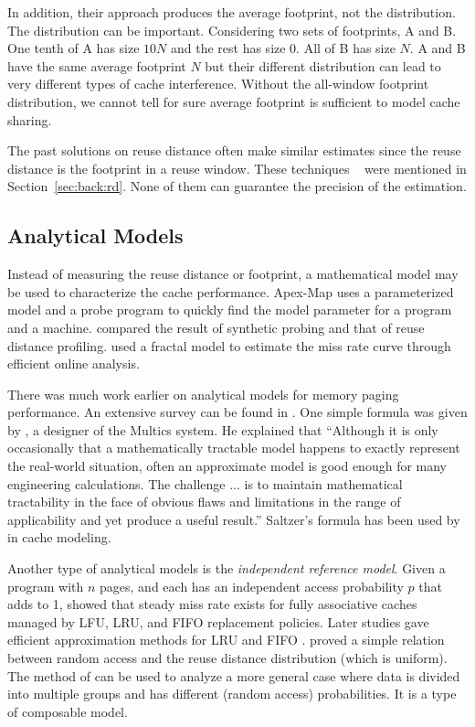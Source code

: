 In addition, their approach produces the average footprint, not the
distribution. The distribution can be important.  Considering two sets
of footprints, A and B.  One tenth of A has size $10N$ and the rest
has size 0.  All of B has size $N$.  A and B have the same average
footprint $N$ but their different distribution can lead to very
different types of cache interference. Without the all-window
footprint distribution, we cannot tell for sure average footprint is
sufficient to model cache sharing.

The past solutions on reuse distance often make similar
estimates since the reuse distance is the footprint in a reuse window.
These techniques
~\citep{BergH:SIGMETRICS05,Shen+:POPL07,ShenS:LCPC08,DingC:MSR09,Jiang+:CC10}
were mentioned in Section~\ref{sec:back:rd}.  None of them can
guarantee the precision of the estimation.

\subsection{Analytical Models}

Instead of measuring the reuse distance or footprint, a mathematical
model may be used to characterize the cache performance.  Apex-Map
uses a parameterized model and a probe program to quickly find the
model parameter for a program and a machine\citep{StrohmaierS:CCPE07}.
\citet{IbrahimS:ICPP10} compared the result of synthetic probing and
that of reuse distance profiling.  \citet{He+:IPDPS12} used a fractal
model to estimate the miss rate curve through efficient online
analysis.

There was much work earlier on analytical models for memory paging
performance.  An extensive survey can be found in
\citet{Denning:TSE80}.  One simple formula was given by
\citet{Saltzer:CACM74}, a designer of the Multics system.  He
explained that ``Although it is only occasionally that a
mathematically tractable model happens to exactly represent the
real-world situation, often an approximate model is good enough for
many engineering calculations. The challenge ... is to maintain
mathematical tractability in the face of obvious flaws and limitations
in the range of applicability and yet produce a useful result.''
Saltzer's formula has been used by \citet{Strecker:TOCS83} in cache
modeling.

Another type of analytical models is the \emph{independent reference
  model}.  Given a program with $n$ pages, and each has an independent
access probability $p$ that adds to 1, \cite{King:IFIP71} showed that
steady miss rate exists for fully associative caches managed by LFU,
LRU, and FIFO replacement policies.  Later studies gave efficient
approximation methods for LRU and FIFO
\citep{FaginP:SIAMJC78,DanT:SIGMETRICS90}.
\citet{GuD:TR930} proved a simple relation between random access and
the reuse distance distribution (which is uniform).  The method of
\citet{DanT:SIGMETRICS90} can be used to analyze a more general
case where data is divided into multiple groups and has different
(random access) probabilities.  It is a type of composable model.

